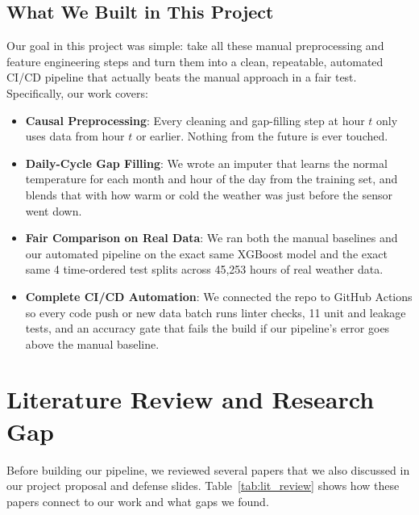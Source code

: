 \documentclass[conference]{IEEEtran}
\begin{document}
\subsection{What We Built in This Project}
Our goal in this project was simple: take all these manual preprocessing and feature engineering steps and turn them into a clean, repeatable, automated CI/CD pipeline that actually beats the manual approach in a fair test. Specifically, our work covers:
\begin{itemize}
    \item \textbf{Causal Preprocessing}: Every cleaning and gap-filling step at hour $t$ only uses data from hour $t$ or earlier. Nothing from the future is ever touched.
    \item \textbf{Daily-Cycle Gap Filling}: We wrote an imputer that learns the normal temperature for each month and hour of the day from the training set, and blends that with how warm or cold the weather was just before the sensor went down.
    \item \textbf{Fair Comparison on Real Data}: We ran both the manual baselines and our automated pipeline on the exact same XGBoost model and the exact same 4 time-ordered test splits across 45,253 hours of real weather data.
    \item \textbf{Complete CI/CD Automation}: We connected the repo to GitHub Actions so every code push or new data batch runs linter checks, 11 unit and leakage tests, and an accuracy gate that fails the build if our pipeline's error goes above the manual baseline.
\end{itemize}

\section{Literature Review and Research Gap}
Before building our pipeline, we reviewed several papers that we also discussed in our project proposal and defense slides. Table~\ref{tab:lit_review} shows how these papers connect to our work and what gaps we found.
\end{document}
